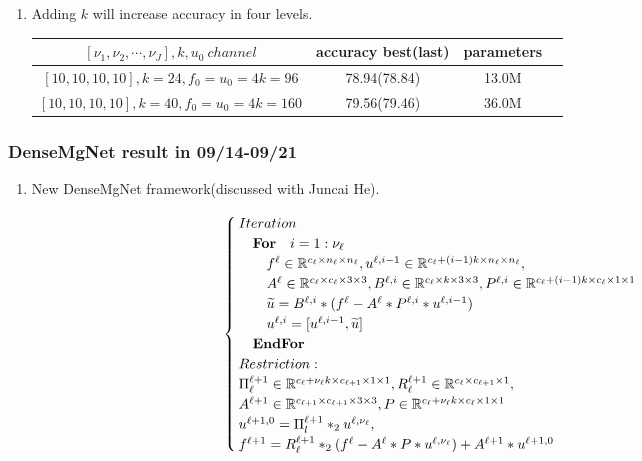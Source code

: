 \begin{enumerate}
\item Adding $k$ will increase accuracy in four levels.
\begin{table}[!htbp]
	\begin{center}
			\begin{tabular}{|c|c|c|c|}
                \hline
				$[\nu_1,\nu_2,\cdots,\nu_J],k,u_0~channel$   &  accuracy best(last)  &   parameters \tabularnewline
				\hline					
				$[10,10,10,10],k=24,f_0=u_0=4k=96$            &  78.94(78.84)         &     13.0M        \tabularnewline
                \hline
                $[10,10,10,10],k=40,f_0=u_0=4k=160$           &  79.56(79.46)         &     36.0M        \tabularnewline
                \hline
			\end{tabular}
	\end{center}
\end{table}
\end{enumerate}

\subsubsection{DenseMgNet result in 09/14-09/21}
\begin{enumerate}
\item New DenseMgNet framework(discussed with Juncai He).
\end{enumerate}
\begin{equation}\label{eq:densenet}
\begin{cases}
Iteration\\
\quad\text{\bf For}\quad i = 1:\nu_{\ell} \\
\quad\quad f^{\ell}\in \mathbb{R}^{c_{\ell}\times n_{\ell}\times n_{\ell}},
           u^{\ell,i-1} \in \mathbb{R}^{c_{\ell}+(i-1)k \times n_{\ell} \times n_{\ell}},\\
\quad\quad A^{\ell} \in \mathbb{R}^{c_{\ell}\times c_{\ell} \times 3 \times 3},B^{\ell,i}\in \mathbb{R}^{c_{\ell}\times k \times 3 \times 3},
           P^{\ell,i} \in \mathbb{R}^{c_{\ell}+(i-1)k \times c_{\ell} \times 1 \times 1}\\
\quad\quad \widetilde{u}=B^{\ell,i}\ast (f^{\ell}-A^{\ell}\ast P^{\ell,i}\ast u^{\ell,i-1}) \\
\quad\quad u^{\ell,i} = [u^{\ell,i-1},\widetilde{u}]\\
\quad \text{\bf EndFor} \\
Restriction:\\
\Pi^{\ell+1}_{\ell} \in \mathbb{R}^{c_{\ell}+\nu_{\ell}k \times c_{\ell+1} \times 1 \times 1},
R^{\ell+1}_{\ell}\in \mathbb{R}^{c_{\ell}\times c_{\ell+1}\times 1 \time 1},\\
A^{\ell+1}\in \mathbb{R}^{c_{\ell+1}\times c_{\ell+1}\times 3 \times 3},
P\in \mathbb{R}^{c_{\ell}+\nu_{\ell}k \times c_{\ell} \times 1 \times 1}\\
u^{\ell+1,0}=\Pi ^{\ell+1}_{l}\ast_2 u^{\ell,\nu_{\ell}},\\
f^{\ell+1}=R^{\ell+1}_{\ell} \ast_2 (f^{\ell}-A^{\ell}\ast P \ast u^{\ell,\nu_{\ell}})+A^{\ell+1}*u^{\ell+1,0}\\
\end{cases}
\end{equation}



